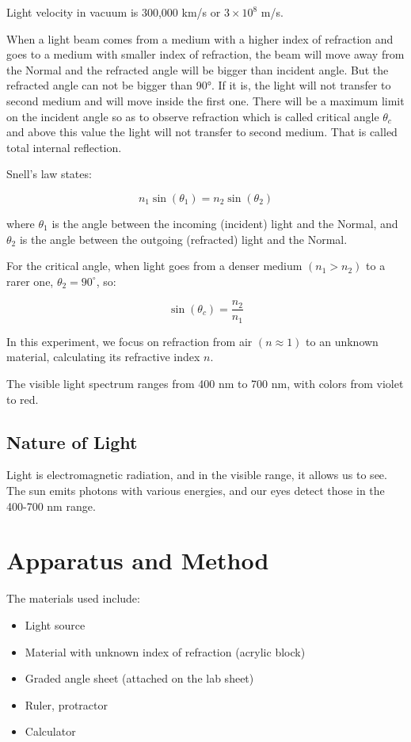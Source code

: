 \documentclass[12pt, a4paper]{article}
\begin{document}
Light velocity in vacuum is 300,000 km/s or $3\times 10^8$ m/s.

When a light beam comes from a medium with a higher index of refraction and goes to a medium with smaller index of refraction, the beam will move away from the Normal and the refracted angle will be bigger than incident angle. But the refracted angle can not be bigger than 90°. If it is, the light will not transfer to second medium and will move inside the first one. There will be a maximum limit on the incident angle so as to observe refraction which is called critical angle $\theta_c$ and above this value the light will not transfer to second medium. That is called total internal reflection.

Snell's law states:

\[ n_1 \sin(\theta_1) = n_2 \sin(\theta_2) \]

where $\theta_1$ is the angle between the incoming (incident) light and the Normal, and $\theta_2$ is the angle between the outgoing (refracted) light and the Normal.

For the critical angle, when light goes from a denser medium $(n_1 > n_2)$ to a rarer one, $\theta_2 = 90^\circ$, so:

\[ \sin(\theta_c) = \frac{n_2}{n_1} \]

In this experiment, we focus on refraction from air $(n \approx 1)$ to an unknown material, calculating its refractive index $n$.

The visible light spectrum ranges from 400 nm to 700 nm, with colors from violet to red.

\subsection{Nature of Light}
Light is electromagnetic radiation, and in the visible range, it allows us to see. The sun emits photons with various energies, and our eyes detect those in the 400-700 nm range.

\section{Apparatus and Method}
The materials used include:
\begin{itemize}
\item Light source
\item Material with unknown index of refraction (acrylic block)
\item Graded angle sheet (attached on the lab sheet)
\item Ruler, protractor
\item Calculator
\end{itemize}
\end{document}
